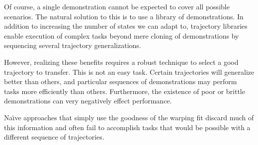 
Of course, a single demonstration cannot be expected to cover all possible scenarios.
The natural solution to this is to use a library of demonstrations.
In addition to increasing the number of states we can adapt to, trajectory libraries
enable execution of complex tasks beyond mere cloning of demonstrations by sequencing 
several trajectory generalizations.

However, realizing these benefits requires a robust technique to select a good trajectory to
transfer.
This is not an easy task.
Certain trajectories will generalize better than others, and particular sequences of 
demonstrations may perform tasks more efficiently than others.
Furthermore, the existence of poor or brittle demonstrations can very negatively 
effect performance.

Na\"{\i}ve approaches that simply use the goodness of the warping fit discard much of this information and often fail to accomplish tasks that would be possible with a different sequence of trajectories.


